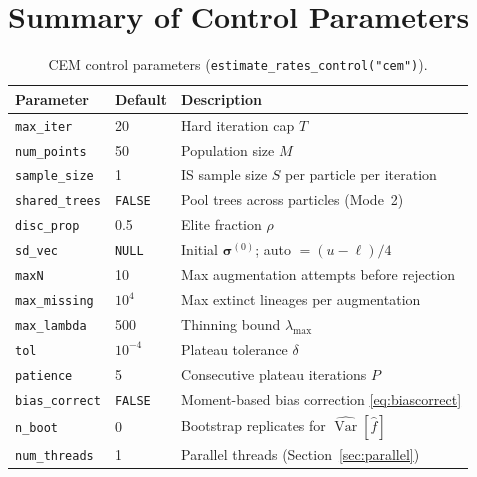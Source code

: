 \documentclass[12pt,a4paper]{article}
\newcommand{\fhat}{\widehat{f}}
\DeclareMathOperator{\Var}{Var}
\begin{document}
\section{Summary of Control Parameters}\label{sec:control}

\begin{table}[ht]
\centering
\caption{CEM control parameters (\texttt{estimate\_rates\_control("cem")}).}
\label{tab:cemcontrol}
\renewcommand{\arraystretch}{1.2}
\begin{tabular}{llp{7.8cm}}
\toprule
Parameter & Default & Description \\
\midrule
\texttt{max\_iter} & 20 & Hard iteration cap $T$ \\
\texttt{num\_points} & 50 & Population size $M$ \\
\texttt{sample\_size} & 1 & IS sample size $S$ per particle per iteration \\
\texttt{shared\_trees} & \texttt{FALSE} & Pool trees across particles (Mode~2) \\
\texttt{disc\_prop} & 0.5 & Elite fraction $\rho$ \\
\texttt{sd\_vec} & \texttt{NULL} & Initial $\bm{\sigma}^{(0)}$; auto $=(u-\ell)/4$ \\
\texttt{maxN} & 10 & Max augmentation attempts before rejection \\
\texttt{max\_missing} & $10^4$ & Max extinct lineages per augmentation \\
\texttt{max\_lambda} & 500 & Thinning bound $\lambda_{\max}$ \\
\texttt{tol} & $10^{-4}$ & Plateau tolerance $\delta$ \\
\texttt{patience} & 5 & Consecutive plateau iterations $P$ \\
\texttt{bias\_correct} & \texttt{FALSE} & Moment-based bias correction \eqref{eq:biascorrect} \\
\texttt{n\_boot} & 0 & Bootstrap replicates for $\widehat{\Var}[\fhat]$ \\
\texttt{num\_threads} & 1 & Parallel threads (Section~\ref{sec:parallel}) \\
\bottomrule
\end{tabular}
\end{table}
\end{document}
